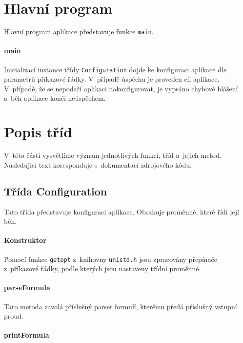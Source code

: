 \documentclass[thesis=B,czech,hidelinks]{thesis}[2012/06/26]
\begin{document}
\section{Hlavní program}

Hlavní program aplikace představuje funkce \texttt{main}.

\paragraph{main}

Inicializací instance třídy \texttt{Configuration} dojde ke konfiguraci aplikace dle parametrů příkazové řádky. V~případě úspěchu je proveden cíl aplikace. V~případě, že se nepodaří aplikaci nakonfigurovat, je vypsáno chybové hlášení a~běh aplikace končí neúspěchem.

\section{Popis tříd}

V~této části vysvětlíme význam jednotlivých funkcí, tříd a~jejich metod. Následující text koresponduje s~dokumentací zdrojového kódu.

\subsection{Třída Configuration}

Tato třída představuje konfiguraci aplikace. Obsahuje proměnné, které řídí její běh.

\paragraph{Konstruktor}

Pomocí funkce \texttt{getopt} z~knihovny \texttt{unistd.h} jsou zpracovány přepínače z~příkazové řádky, podle kterých jsou nastaveny třídní proměnné.

\paragraph{parseFormula}

Tato metoda zavolá příslušný parser formulí, kterému předá příslušný vstupní proud.

\paragraph{printFormula}
\end{document}
